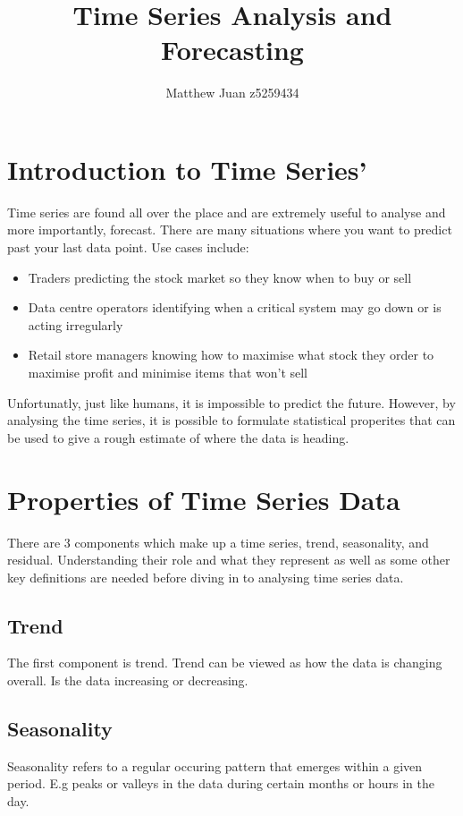 \documentclass{article}
\title{Time Series Analysis and Forecasting}
\author{Matthew Juan z5259434}
\date{}
\begin{document}
  \maketitle

  \newpage
  \doublespacing
  \tableofcontents
  \singlespacing
  \newpage
  \section{Introduction to Time Series'}
  Time series are found all over the place and are extremely useful
  to analyse and more importantly, forecast. There are many situations where
  you want to predict past your last data point.
  Use cases include:
  \begin{itemize}
    \item Traders predicting the stock market so they know when to buy or sell
    \item Data centre operators identifying when a critical system may go down or is acting irregularly
    \item Retail store managers knowing how to maximise what stock they order to maximise profit and minimise items that won't sell
  \end{itemize}
  Unfortunatly, just like humans, it is impossible to predict the future.
  However, by analysing the time series, it is possible to formulate
  statistical properites that can be used to give a rough estimate of
  where the data is heading.

  \section{Properties of Time Series Data}
  There are 3 components which make up a time series, trend, seasonality, and residual. Understanding their role and what they represent as well as some other key definitions are needed before diving in to analysing time series data.
  
  \subsection{Trend}
  The first component is trend. Trend can be viewed as how the data is changing overall. Is the data increasing or decreasing.
  
  \subsection{Seasonality}
  Seasonality refers to a regular occuring pattern that emerges within a given period. E.g peaks or valleys in the data during certain months or hours in the day.
  
\end{document}

